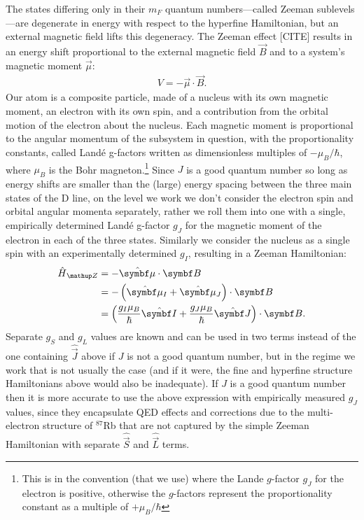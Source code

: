 The states differing only in their $m_F$ quantum numbers---called Zeeman sublevels---are degenerate in energy with respect to the hyperfine Hamiltonian, but an external magnetic field lifts this degeneracy. The Zeeman effect [CITE] results in an energy shift proportional to the external magnetic field $\vec B$ and to a system's magnetic moment $\vec \mu$:
\begin{align}
V = - \vec\mu\cdot\vec B.
\end{align} 
Our atom is a composite particle, made of a nucleus with its own magnetic moment, an electron with its own spin, and a contribution from the orbital motion of the electron about the nucleus. Each magnetic moment is proportional to the angular momentum of the subsystem in question, with the proportionality constants, called Land\'e g-factors written as dimensionless multiples of $-\mu_B/\hbar$, where $\mu_B$ is the Bohr magneton.\footnote{This is in the convention (that we use) where the Lande $g$-factor $g_J$ for the electron is positive, otherwise the $g$-factors represent the proportionality constant as a multiple of $+\mu_B/\hbar$} Since $J$ is a good quantum number so long as energy shifts are smaller than the (large) energy spacing between the three main states of the D line, on the level we work we don't consider the electron spin and orbital angular momenta separately, rather we roll them into one with a single, empirically determined Land\'e g-factor $g_J$ for the magnetic moment of the electron in each of the three states. Similarly we consider the nucleus as a single spin with an experimentally determined $g_I$, resulting in a Zeeman Hamiltonian:
\begin{align}
\hat H_\up{Z} & = -\hat{\vec \mu} \cdot \vec B\\
&= -\left(\hat{\vec \mu}_I + \hat{\vec \mu}_J\right) \cdot \vec B\\
&=\left(\frac{g_I\mu_B}{\hbar} \hat{\vec I} + \frac{g_J\mu_B}{\hbar} \hat{\vec J}\right) \cdot \vec B.\label{eq:H_Z}
\end{align}
Separate $g_S$ and $g_L$ values are known and can be used in two terms instead of the one containing $\hat{\vec J}$ above if $J$ is not a good quantum number, but in the regime we work that is not usually the case (and if it were, the fine and hyperfine structure Hamiltonians above would also be inadequate). If $J$ is a good quantum number then it is more accurate to use the above expression with empirically measured $g_J$ values, since they encapsulate QED effects and corrections due to the multi-electron structure of $^{87}$Rb that are not captured by the simple Zeeman Hamiltonian with separate $\hat{\vec S}$ and $\hat{\vec L}$ terms. 

